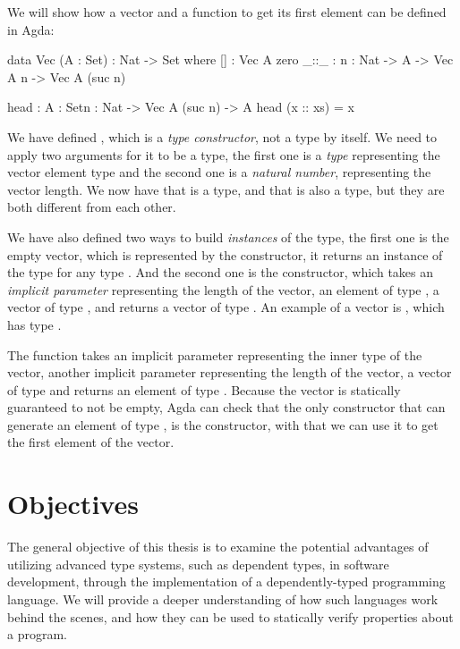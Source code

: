 We will show how a vector and a function to get its first element can be defined in Agda:

\begin{piforall}
data Vec (A : Set) : Nat -> Set where
       [] : Vec A zero
       _::_ : {n : Nat} -> A -> Vec A n -> Vec A (suc n)

head : {A : Set}{n : Nat} -> Vec A (suc n) -> A
head (x :: xs) = x
\end{piforall}

We have defined , which is a \emph{type constructor}, not a type by itself. We need to apply two arguments for it to be a type, the first one is a \emph{type} representing the vector element type and the second one is a \emph{natural number}, representing the vector length. We now have that  is a type, and that  is also a type, but they are both different from each other.

We have also defined two ways to build \emph{instances} of the  type, the first one is the empty vector, which is represented by the \code{[]} constructor, it returns an instance of the type  for any type . And the second one is the \code{_::_} constructor, which takes an \emph{implicit parameter}  representing the length of the vector, an element of type , a vector of type , and returns a vector of type . An example of a vector is , which has type .

The  function takes an implicit parameter  representing the inner type of the vector, another implicit parameter  representing the length of the vector, a vector of type  and returns an element of type . Because the vector is statically guaranteed to not be empty, Agda can check that the only constructor that can generate an element of type , is the \code{_::_} constructor, with that we can use it to get the first element of the vector.

\section{Objectives}

The general objective of this thesis is to examine the potential advantages of utilizing advanced type systems, such as dependent types, in software development, through the implementation of a dependently-typed programming language. We will provide a deeper understanding of how such languages work behind the scenes, and how they can be used to statically verify properties about a program.

